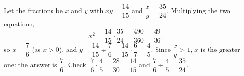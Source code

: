 Let the fractions be $x$ and $y$ with $xy=\dfrac{14}{15}$ and $\dfrac {x}{y}=\dfrac{35}{24}$. Multiplying the two equations,
\[
x^2=\dfrac{14}{15}\cdot\dfrac{35}{24}=\dfrac{490}{360}=\dfrac{49}{36},
\]
so $x=\dfrac{7}{6}$ (as $x>0$), and $y=\dfrac{14}{15}\div\dfrac{7}{6}=\dfrac{14}{15}\cdot\dfrac{6}{7}=\dfrac{4}{5}$. Since $\dfrac {x}{y}>1$, $x$ is the greater one: the answer is $\boxed{\dfrac{7}{6}}$. Check: $\dfrac{7}{6}\cdot\dfrac{4}{5}=\dfrac{28}{30}=\dfrac{14}{15}$ and $\dfrac{7}{6}\div\dfrac{4}{5}=\dfrac{35}{24}$.
